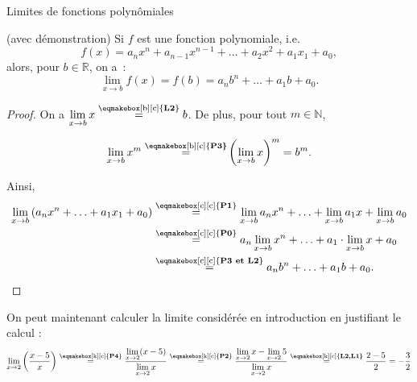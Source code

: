 \documentclass[a4paper,12pt]{article}
\begin{document}
\begin{coro}[label=thm:poly]
Limites de fonctions polynômiales	

(avec démonstration)
	\tcblower
	Si $f$ est une fonction polynomiale, i.e. 
	\[f(x)=a_nx^n+a_{n-1}x^{n-1}+\ldots+a_2 x^2+a_1x_1+a_0,\]
	alors, pour $b\in\mathbb{R}$, on a~:
	\[\lim_{x\rightarrow b}f(x)=f(b)=a_n b^n+\ldots+a_1b+a_0.\]
\begin{proof}
	On a $\displaystyle{\lim_{x\rightarrow b}x}\stackrel{\text{\eqmakebox[b][c]{{\bfseries L2}}}}{=}b$. De plus, pour tout $m\in \mathbb{N}$, 

	\[\displaystyle{\lim_{x\rightarrow b}x^m\stackrel{\text{\eqmakebox[b][c]{\bfseries P3}}}{=}}\left(\displaystyle{\lim_{x\rightarrow b}x}\right)^m=b^m.\] 

Ainsi,
\begin{align*}
	\lim_{x\rightarrow b} \left(a_nx^n+\ldots +a_1x_1+a_0\right)&\stackrel{\text{\eqmakebox[c][c]{{\bfseries P1}}}}{=}\lim_{x\rightarrow b} a_nx^n+\ldots+\lim_{x\rightarrow b} a_1x+\lim_{x\rightarrow b}a_0\\
									     &\stackrel{\text{\eqmakebox[c][c]{{\bfseries P0}}}}{=}a_n\lim_{x\rightarrow b} x^n+\ldots+a_1\cdot\lim_{x\rightarrow b} x+a_0\\							     
									     &\stackrel{\text{\eqmakebox[c][c]{{\bfseries P3 et L2}}}}{=}a_n b^n+\ldots+a_1b+a_0.
\end{align*}


\end{proof}
\end{coro}



\begin{exemple}
	\tcblower
On peut maintenant calculer la limite considérée en introduction en justifiant le calcul :
	\[\lim_{x\to2}\left(\dfrac{x-5}{x}\right)
		\stackrel{\text{\eqmakebox[k][c]{{\bfseries P4}}}}{=}
\dfrac{\displaystyle{\lim_{x\to2}(x-5)}}{\displaystyle{\lim_{x\to2}x}}
\stackrel{\text{\eqmakebox[k][c]{{\bfseries {P2}}}}}{=}
\dfrac{\displaystyle{\lim_{x\to2}x-\lim_{x\to2}5}}{\displaystyle{\lim_{x\to2}x}}
\stackrel{\text{{\eqmakebox[k][c]{\bfseries {L2,L1}}}}}{=}
\dfrac{2-5}{2}
=-\dfrac{3}{2}
\]
\end{exemple}
\end{document}
